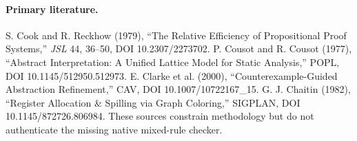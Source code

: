 \paragraph{Primary literature.}
S. Cook and R. Reckhow (1979), ``The Relative Efficiency of Propositional Proof Systems,'' \emph{JSL} 44, 36--50, DOI 10.2307/2273702. P. Cousot and R. Cousot (1977), ``Abstract Interpretation: A Unified Lattice Model for Static Analysis,'' POPL, DOI 10.1145/512950.512973. E. Clarke et al. (2000), ``Counterexample-Guided Abstraction Refinement,'' CAV, DOI 10.1007/10722167\_15. G. J. Chaitin (1982), ``Register Allocation \& Spilling via Graph Coloring,'' SIGPLAN, DOI 10.1145/872726.806984. These sources constrain methodology but do not authenticate the missing native mixed-rule checker.
